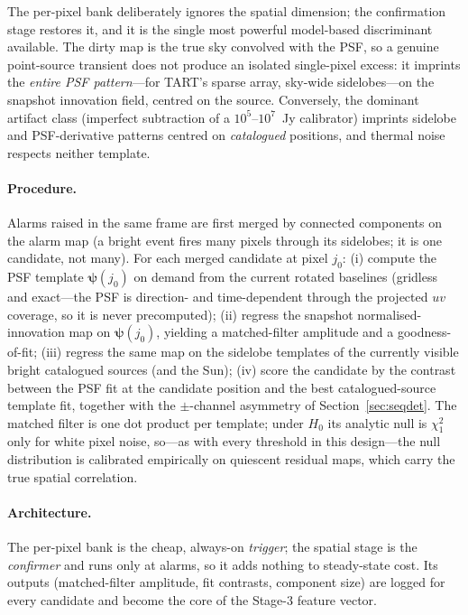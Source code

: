 \documentclass[11pt]{article}
\begin{document}
The per-pixel bank deliberately ignores the spatial dimension; the confirmation stage restores it,
and it is the single most powerful model-based discriminant available. The dirty map is the true
sky convolved with the PSF, so a genuine point-source transient does not produce an isolated
single-pixel excess: it imprints the \emph{entire PSF pattern}---for TART's sparse array, sky-wide
sidelobes---on the snapshot innovation field, centred on the source. Conversely, the dominant
artifact class (imperfect subtraction of a $10^5$--$10^7$~Jy calibrator) imprints sidelobe and
PSF-derivative patterns centred on \emph{catalogued} positions, and thermal noise respects neither
template.

\paragraph{Procedure.} Alarms raised in the same frame are first merged by connected components on
the alarm map (a bright event fires many pixels through its sidelobes; it is one candidate, not
many). For each merged candidate at pixel $j_0$: (i) compute the PSF template
$\bm{\psi}(j_0)$ on demand from the current rotated baselines (gridless and exact---the PSF is
direction- and time-dependent through the projected $uv$ coverage, so it is never precomputed);
(ii) regress the snapshot normalised-innovation map on $\bm{\psi}(j_0)$, yielding a matched-filter
amplitude and a goodness-of-fit; (iii) regress the same map on the sidelobe templates of the
currently visible bright catalogued sources (and the Sun); (iv) score the candidate by the contrast
between the PSF fit at the candidate position and the best catalogued-source template fit, together
with the $\pm$-channel asymmetry of Section~\ref{sec:seqdet}. The matched filter is one dot product
per template; under $H_0$ its analytic null is $\chi^2_1$ only for white pixel noise, so---as with
every threshold in this design---the null distribution is calibrated empirically on quiescent
residual maps, which carry the true spatial correlation.

\paragraph{Architecture.} The per-pixel bank is the cheap, always-on \emph{trigger}; the spatial
stage is the \emph{confirmer} and runs only at alarms, so it adds nothing to steady-state cost. Its
outputs (matched-filter amplitude, fit contrasts, component size) are logged for every candidate
and become the core of the Stage-3 feature vector.
\end{document}
